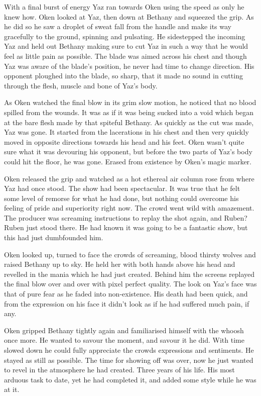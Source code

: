 With a final burst of energy Yaz ran towards Oken using the speed as only he knew how.  Oken looked at Yaz, then down at Bethany and squeezed the grip.  As he did so he saw a droplet of sweat fall from the handle and make its way gracefully to the ground, spinning and pulsating.  He sidestepped the incoming Yaz and held out Bethany making sure to cut Yaz in such a way that he would feel as little pain as possible.  The blade was aimed across his chest and though Yaz was aware of the blade's position, he never had time to change direction.  His opponent ploughed into the blade, so sharp, that it made no sound in cutting through the flesh, muscle and bone of Yaz's body.  

As Oken watched the final blow in its grim slow motion, he noticed that no blood spilled from the wounds.  It was as if it was being sucked into a void which began at the bare flesh made by that spiteful Bethany.  As quickly as the cut was made, Yaz was gone.  It started from the lacerations in his chest and then very quickly moved in opposite directions towards his head and his feet.  Oken wasn't quite sure what it was devouring his opponent, but before the two parts of Yaz's body could hit the floor, he was gone.  Erased from existence by Oken's magic marker.

Oken released the grip and watched as a hot ethereal air column rose from where Yaz had once stood.  The show had been spectacular.  It was true that he felt some level of remorse for what he had done, but nothing could overcome his feeling of pride and superiority right now.  The crowd went wild with amazement.  The producer was screaming instructions to replay the shot again, and Ruben?  Ruben just stood there.  He had known it was going to be a fantastic show, but this had just dumbfounded him.  

Oken looked up, turned to face the crowds of screaming, blood thirsty wolves and raised Bethany up to sky.  He held her with both hands above his head and revelled in the mania which he had just created.  Behind him the screens replayed the final blow over and over with pixel perfect quality.  The look on Yaz's face was that of pure fear as he faded into non-existence.  His death had been quick, and from the expression on his face it didn't look as if he had suffered much pain, if any.

Oken gripped Bethany tightly again and familiarised himself with the whoosh once more.  He wanted to savour the moment, and savour it he did.  With time slowed down he could fully appreciate the crowds expressions and sentiments.  He stayed as still as possible.  The time for showing off was over, now he just wanted to revel in the atmosphere he had created.  Three years of his life.  His most arduous task to date, yet he had completed it, and added some style while he was at it.

